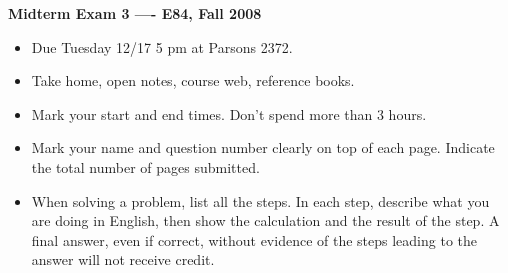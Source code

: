 \usepackage{html}

\begin{center}
{\Large \bf  Midterm Exam 3 ---- E84, Fall 2008}
\end{center}

\begin{itemize}
\item Due Tuesday 12/17 5 pm at Parsons 2372.
\item Take home, open notes, course web, reference books.
\item Mark your start and end times. Don't spend more than 3 hours.
\item Mark your name and question number clearly on top of each page.
	Indicate the total number of pages submitted.
\item When solving a problem, list all the steps. In each step, describe 
	what you are doing in English, then show the calculation and the 
	result of the step. A final answer, even if correct, without 
	evidence of the steps leading to the answer will not receive credit.
\end{itemize}

